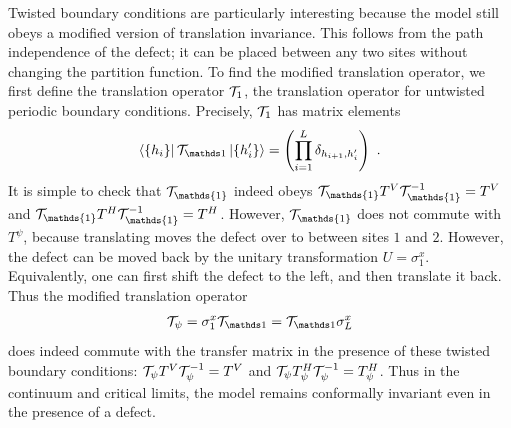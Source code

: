\documentclass[11pt]{article}
\newcommand{\T}{{{\cal T}}} %
\numberwithin{equation}{section}		%
\begin{document}
Twisted boundary conditions are particularly interesting because the model still obeys a modified version of translation invariance. This follows from the path independence of the defect; it can be placed between any two sites without changing the partition function. To find the modified translation operator, we first define the translation operator $\T_1$, the translation operator for untwisted periodic boundary conditions. Precisely, $ \T_1$ has matrix elements
\begin{align}
\bra{ \{ h_i\}} { \T}_{\mathds 1} \ket{\{h_i'\}}=  \left( \prod_{i=1}^{L} \delta_{h_{i+1},h_i'} \right)\ .
\label{T1def}
\end{align}
It is simple to check that  ${\cal T}_{\mathds{1}}$ indeed obeys ${\cal T}_{\mathds{1}} T^V {\cal T}_{\mathds{1}}^{-1}=T^V$ and ${\cal T}_{\mathds{1}} T^H {\cal T}_{\mathds{1}}^{-1}=T^H$. However, ${\cal T}_{\mathds{1}}$ does not commute with $T^{\psi}$, because translating moves the defect over to between sites $1$ and $2$. However, the defect can be moved back by the unitary transformation $U=\sigma^x_1$. Equivalently, one can first shift the defect to the left, and then translate it back.
Thus the modified translation operator 
\begin{align}
{\T}_\psi = \sigma^x_1 { \T}_{\mathds 1}={ \T}_{\mathds 1}\sigma^x_L
\label{Tpsidef}
\end{align}
does indeed commute with the transfer matrix in the presence of these twisted boundary conditions:
${ \T}_\psi T^V {\T}_\psi^{-1}=T^V$ and ${ \T}_\psi T^H_\psi {\T}_\psi^{-1}=T^H_\psi$. 
Thus in the continuum and critical limits, the model remains conformally invariant even in the presence of a defect.
\end{document}
